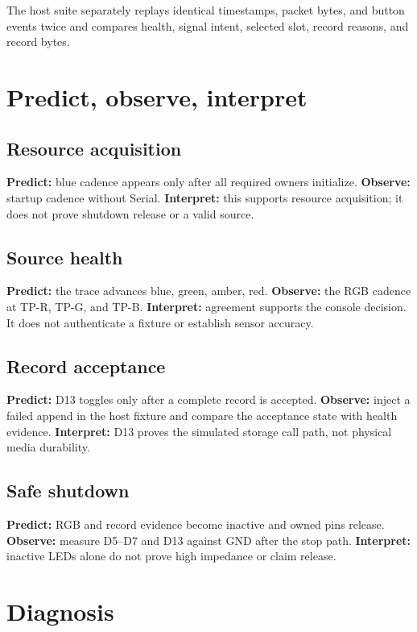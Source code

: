 \documentclass[11pt]{article}
\begin{document}
The host suite separately replays identical timestamps, packet bytes, and
button events twice and compares health, signal intent, selected slot, record
reasons, and record bytes.

\section{Predict, observe, interpret}

\subsection{Resource acquisition}

\textbf{Predict:} blue cadence appears only after all required owners
initialize. \textbf{Observe:} startup cadence without Serial.
\textbf{Interpret:} this supports resource acquisition; it does not prove
shutdown release or a valid source.

\subsection{Source health}

\textbf{Predict:} the trace advances blue, green, amber, red.
\textbf{Observe:} the RGB cadence at TP-R, TP-G, and TP-B.
\textbf{Interpret:} agreement supports the console decision. It does not
authenticate a fixture or establish sensor accuracy.

\subsection{Record acceptance}

\textbf{Predict:} D13 toggles only after a complete record is accepted.
\textbf{Observe:} inject a failed append in the host fixture and compare the
acceptance state with health evidence.
\textbf{Interpret:} D13 proves the simulated storage call path, not physical
media durability.

\subsection{Safe shutdown}

\textbf{Predict:} RGB and record evidence become inactive and owned pins
release. \textbf{Observe:} measure D5--D7 and D13 against GND after the stop
path. \textbf{Interpret:} inactive LEDs alone do not prove high impedance or
claim release.

\section{Diagnosis}
\end{document}
